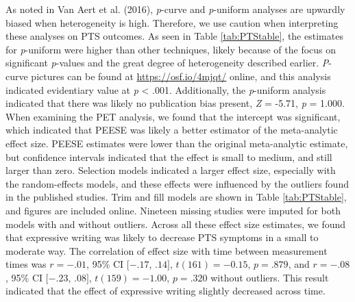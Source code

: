 \documentclass[man, mask]{apa6}
\theoremstyle{definition}
\theoremstyle{definition}
\theoremstyle{definition}
\theoremstyle{remark}
\begin{document}
As noted in Van Aert et al. (2016), \emph{p}-curve and \emph{p}-uniform
analyses are upwardly biased when heterogeneity is high. Therefore, we
use caution when interpreting these analyses on PTS outcomes. As seen in
Table \ref{tab:PTStable}, the estimates for \emph{p}-uniform were higher
than other techniques, likely because of the focus on significant
\emph{p}-values and the great degree of heterogeneity described earlier.
\emph{P}-curve pictures can be found at \url{https://osf.io/4mjqt/}
online, and this analysis indicated evidentiary value at \emph{p}
\textless{} .001. Additionally, the \emph{p}-uniform analysis indicated
that there was likely no publication bias present, \emph{Z} = -5.71,
\emph{p} = 1.000. When examining the PET analysis, we found that the
intercept was significant, which indicated that PEESE was likely a
better estimator of the meta-analytic effect size. PEESE estimates were
lower than the original meta-analytic estimate, but confidence intervals
indicated that the effect is small to medium, and still larger than
zero. Selection models indicated a larger effect size, especially with
the random-effects models, and these effects were influenced by the
outliers found in the published studies. Trim and fill models are shown
in Table \ref{tab:PTStable}, and figures are included online. Nineteen
missing studies were imputed for both models with and without outliers.
Across all these effect size estimates, we found that expressive writing
was likely to decrease PTS symptoms in a small to moderate way. The
correlation of effect size with time between measurement times was
\(r = -.01\), 95\% CI \([-.17\), \(.14]\), \(t(161) = -0.15\),
\(p = .879\), and \(r = -.08\), 95\% CI \([-.23\), \(.08]\),
\(t(159) = -1.00\), \(p = .320\) without outliers. This result indicated
that the effect of expressive writing slightly decreased across time.
\end{document}
